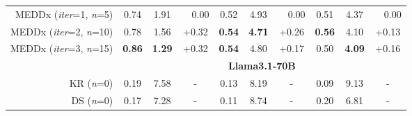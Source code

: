 \begin{table*}[ht]
\begin{tabular}{rccccccccc}
 MEDDx (\textit{iter}=1, \textit{n}=5)                       & 0.74           & 1.91     & ~~0.00 & 0.52        & 4.93      &  ~~0.00   & 0.51         & 4.37        &   ~~0.00\\
MEDDx (\textit{iter}=2, \textit{n}=10)                       & 0.78           & 1.56    & +0.32  & \textbf{0.54}        & \textbf{4.71}    &    +0.26   & \textbf{0.56}         & 4.10   &     +0.13   \\
MEDDx (\textit{iter}=3, \textit{n}=15)                       & \textbf{0.86}           & \textbf{1.29}    & +0.32  & \textbf{0.54}        & 4.80      & +0.17    & 0.50         & \textbf{4.09}       &   +0.16 \\\midrule
                               & \multicolumn{9}{c}{\textbf{Llama3.1-70B}}                                                           \\ \midrule
KR (\textit{n}=0)           &   0.19         &  7.58  &  -  &      0.13   &   8.19      & -  &    0.09      &  9.13  &    -   \\
DS (\textit{n}=0)    &        0.17        &       7.28     &       -      &      0.11          &      8.74        &          -      &       0.20       &      6.81       &           -      \\

\end{tabular}
\end{table*}
